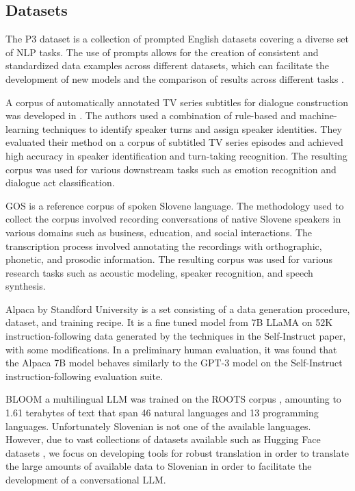 \documentclass[fleqn,moreauthors,10pt]{ds_report}
\begin{document}
\subsection*{Datasets}
The P3 dataset is a collection of prompted English datasets covering a diverse set of NLP tasks. The use of prompts allows for the creation of consistent and standardized data examples across different datasets, which can facilitate the development of new models and the comparison of results across different tasks \cite{bach2022promptsource}. 

A corpus of automatically annotated TV series subtitles for dialogue construction was developed in \cite{tv_series_subtitles}. The authors used a combination of rule-based and machine-learning techniques to identify speaker turns and assign speaker identities. They evaluated their method on a corpus of subtitled TV series episodes and achieved high accuracy in speaker identification and turn-taking recognition. The resulting corpus was used for various downstream tasks such as emotion recognition and dialogue act classification.

GOS \cite{Verdonik2013} is a reference corpus of spoken Slovene language. The methodology used to collect the corpus involved recording conversations of native Slovene speakers in various domains such as business, education, and social interactions. The transcription process involved annotating the recordings with orthographic, phonetic, and prosodic information. The resulting corpus was used for various research tasks such as acoustic modeling, speaker recognition, and speech synthesis. 

Alpaca \cite{alpaca} by Standford University is a set consisting of a data generation procedure, dataset, and training recipe. It is a fine tuned model from 7B LLaMA \cite{touvron2023llama} on 52K instruction-following data generated by the techniques in the Self-Instruct \cite{wang2022selfinstruct} paper, with some modifications. In a preliminary human evaluation, it was found that the Alpaca 7B model behaves similarly to the GPT-3 model on the Self-Instruct instruction-following evaluation suite.

BLOOM \cite{scao2022bloom} a multilingual LLM  was trained on the ROOTS corpus \cite{roots}, amounting to 1.61 terabytes of text that span 46 natural languages and 13 programming languages. Unfortunately Slovenian is not one of the available languages. However, due to vast collections of datasets available such as  Hugging Face datasets \cite{lhoest2021datasets}, we focus on developing tools for robust translation in order to translate the large amounts of available data to Slovenian in order to facilitate the development of a conversational LLM.
\end{document}
